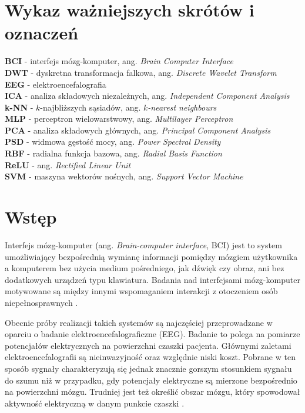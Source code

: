 \documentclass[notitlepage]{report}
\begin{document}
\tableofcontents

\chapter*{Wykaz ważniejszych skrótów i oznaczeń}
\noindent \textbf{BCI} - interfejs mózg-komputer, ang. \textit{Brain Computer Interface} \\
\textbf{DWT} - dyskretna transformacja falkowa, ang. \textit{Discrete Wavelet Transform} \\
\textbf{EEG} - elektroencefalografia \\
\textbf{ICA} - analiza składowych niezależnych, ang. \textit{Independent Component Analysis} \\
\textbf{k-NN} - $k$-najbliższych sąsiadów, ang. \textit{$k$-nearest neighbours} \\
\textbf{MLP} - perceptron wielowarstwowy, ang. \textit{Multilayer Perceptron} \\
\textbf{PCA} - analiza składowych głównych, ang. \textit{Principal Component Analysis} \\
\textbf{PSD} - widmowa gęstość mocy, ang. \textit{Power Spectral Density} \\
\textbf{RBF} - radialna funkcja bazowa, ang. \textit{Radial Basis Function} \\
\textbf{ReLU} - ang. \textit{Rectified Linear Unit} \\
\textbf{SVM} - maszyna wektorów nośnych, ang. \textit{Support Vector Machine} \\



\chapter*{Wstęp}
 

Interfejs mózg-komputer (ang. \textit{Brain-computer interface}, BCI) jest to system umożliwiający bezpośrednią wymianę informacji pomiędzy mózgiem użytkownika a komputerem bez użycia medium pośredniego, jak dźwięk czy obraz, ani bez dodatkowych urządzeń typu klawiatura. Badania nad interfejsami mózg-komputer motywowane są między innymi wspomaganiem interakcji z otoczeniem osób niepełnosprawnych \cite{machado} \cite{nicolasalonso}. 

Obecnie próby realizacji takich systemów są najczęściej przeprowadzane w oparciu o badanie elektroencefalograficzne (EEG). Badanie to polega na pomiarze potencjałów elektrycznych na powierzchni czaszki pacjenta. Głównymi zaletami elektroencefalografii są nieinwazyjność oraz względnie niski koszt. Pobrane w ten sposób sygnały charakteryzują się jednak znacznie gorszym stosunkiem sygnału do szumu niż w przypadku, gdy potencjały elektryczne są mierzone bezpośrednio na powierzchni mózgu. Trudniej jest też określić obszar mózgu, który spowodował aktywność elektryczną w danym punkcie czaszki \cite{shenoy} \cite{hill}.
\end{document}

